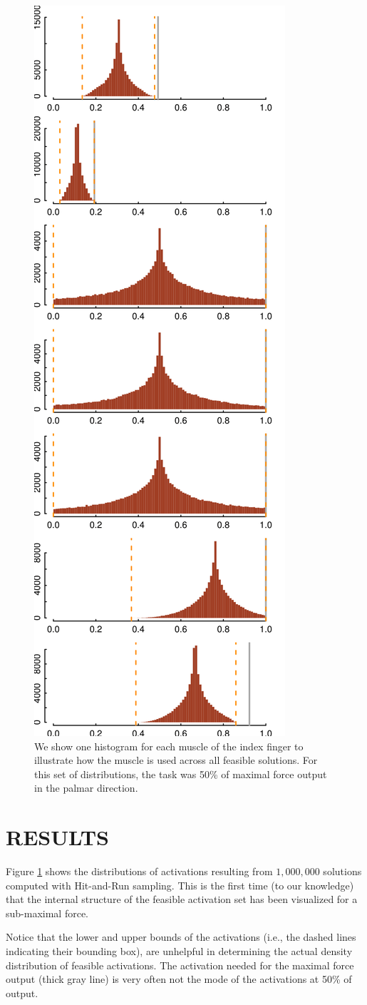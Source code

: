 \begin{figure}[htbp]
\centering
\includegraphics[width=7.5cmh]{sections/figs/raw_histograms.png}
\caption{We show one histogram for each muscle of the index finger to illustrate how the muscle is used across all feasible solutions.
For this set of distributions, the task was 50\% of maximal force output in the palmar direction.}
\label{fig:raw_histograms}
\end{figure}


\section{RESULTS}

Figure \ref{fig:raw_histograms} shows the distributions of activations resulting from $1,000,000$ solutions computed with Hit-and-Run sampling. This is the first time (to our knowledge) that the internal structure of the feasible activation set has been visualized for a sub-maximal force.

Notice that the lower and upper bounds of the activations (i.e., the dashed lines indicating their bounding box), are unhelpful in determining the actual density distribution of feasible activations.
The activation needed for the maximal force output (thick gray line) is very often not the mode of the activations at 50\% of output.

